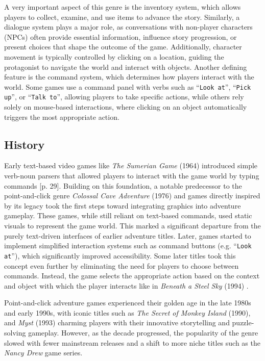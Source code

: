 A very important aspect of this genre is the inventory system, which allows players to collect, examine, and use items to advance the story. Similarly, a dialogue system plays a major role, as conversations with non-player characters (NPCs) often provide essential information, influence story progression, or present choices that shape the outcome of the game. Additionally, character movement is typically controlled by clicking on a location, guiding the protagonist to navigate the world and interact with objects. Another defining feature is the command system, which determines how players interact with the world. Some games use a command panel with verbs such as “\texttt{Look at}”, “\texttt{Pick up}”, or “\texttt{Talk to}”, allowing players to take specific actions, while others rely solely on mouse-based interactions, where clicking on an object automatically triggers the most appropriate action. 

\subsection{History}
Early text-based video games like \textit{The Sumerian Game} (1964) introduced simple verb-noun parsers that allowed players to interact with the game world by typing commands \cite{Salter2014}[p. 29]. Building on this foundation, a notable predecessor to the point-and-click genre \textit{Colossal Cave Adventure} (1976) and games directly inspired by its legacy took the first steps toward integrating graphics into adventure gameplay. These games, while still reliant on text-based commands, used static visuals to represent the game world. This marked a significant departure from the purely text-driven interfaces of earlier adventure titles. Later, games started to implement simplified interaction systems such as command buttons (e.g. “\texttt{Look at}”), which significantly improved accessibility. Some later titles took this concept even further by eliminating the need for players to choose between commands. Instead, the game selects the appropriate action based on the context and object with which the player interacts like in \textit{Beneath a Steel Sky} (1994) \cite{Carton2023history}.

Point-and-click adventure games experienced their golden age in the late 1980s and early 1990s, with iconic titles such as \textit{The Secret of Monkey Island} (1990), and \textit{Myst} (1993) charming players with their innovative storytelling and puzzle-solving gameplay. However, as the decade progressed, the popularity of the genre slowed \cite{Qaffas202022} with fewer mainstream releases and a shift to more niche titles such as the \textit{Nancy Drew} game series.

